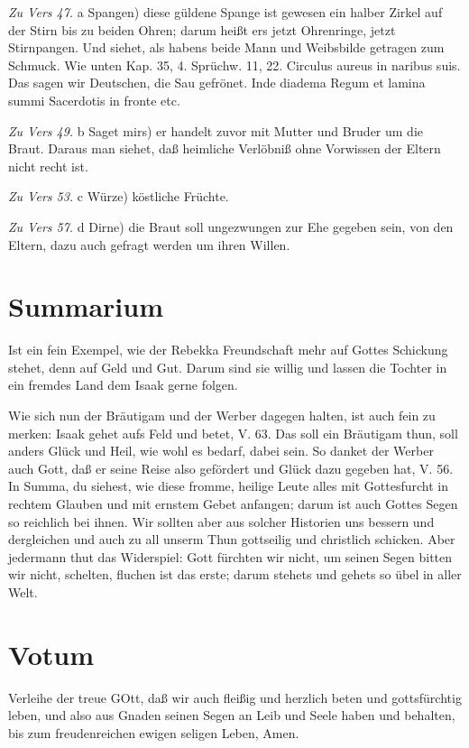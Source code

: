 \emph{Zu Vers 47.} a Spangen) diese güldene Spange ist gewesen ein halber Zirkel auf der Stirn bis zu beiden Ohren; darum heißt ers jetzt Ohrenringe, jetzt Stirnpangen. Und siehet, als habens beide Mann und Weibsbilde getragen zum Schmuck. Wie unten Kap. 35, 4. Sprüchw. 11, 22. Circulus aureus in naribus suis. Das sagen wir Deutschen, die Sau gefrönet. Inde diadema Regum et lamina summi Sacerdotis in fronte etc.

\emph{Zu Vers 49.} b Saget mirs) er handelt zuvor mit Mutter und Bruder um die Braut. Daraus man siehet, daß heimliche Verlöbniß ohne Vorwissen der Eltern nicht recht ist.

\emph{Zu Vers 53.} c Würze) köstliche Früchte.

\emph{Zu Vers 57.} d Dirne) die Braut soll ungezwungen zur Ehe gegeben sein, von den Eltern, dazu auch gefragt werden um ihren Willen.

\section{Summarium}

Ist ein fein Exempel, wie der Rebekka Freundschaft mehr auf Gottes Schickung stehet, denn auf Geld und Gut. Darum sind sie willig und lassen die Tochter in ein fremdes Land dem Isaak gerne folgen.

Wie sich nun der Bräutigam und der Werber dagegen halten, ist auch fein zu merken: Isaak gehet aufs Feld und betet, V. 63. Das soll ein Bräutigam thun, soll anders Glück und Heil, wie wohl es bedarf, dabei sein. So danket der Werber auch Gott, daß er seine Reise also gefördert und Glück dazu gegeben hat, V. 56. In Summa, du siehest, wie diese fromme, heilige Leute alles mit Gottesfurcht in rechtem Glauben und mit ernstem Gebet anfangen; darum ist auch Gottes Segen so reichlich bei ihnen. Wir sollten aber aus solcher Historien uns bessern und dergleichen und auch zu all unserm Thun gottseilig und christlich schicken. Aber jedermann thut das Widerspiel: Gott fürchten wir nicht, um seinen Segen bitten wir nicht, schelten, fluchen ist das erste; darum stehets und gehets so übel in aller Welt.

\section{Votum}

Verleihe der treue GOtt, daß wir auch fleißig und herzlich beten und gottsfürchtig leben, und also aus Gnaden seinen Segen an Leib und Seele haben und behalten, bis zum freudenreichen ewigen seligen Leben, Amen.

